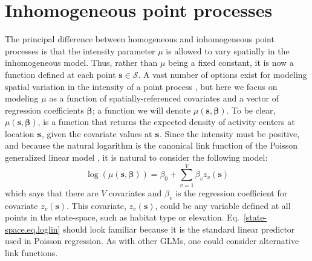 \section{Inhomogeneous point processes}

The principal difference between homogeneous and inhomogeneous point
processes is that the intensity parameter $\mu$ is allowed to vary spatially
in the inhomogeneous model. Thus, rather than $\mu$ being a fixed constant,
it is now a function defined at each point $\mathbf{s} \in
\mathcal{S}$. A vast number of options exist for modeling spatial
variation in the intensity of a point process
\citep{cox:1955,stoyan_penttinen:2000,illian_etal:2008}, but here we
focus on modeling $\mu$ as a function of
spatially-referenced covariates and a vector of regression
coefficients $\bm \beta$; a function we will denote $\mu(\mathbf{s},
\bm{\beta})$. To be clear, $\mu(\mathbf{s}, \bm{\beta})$, is a
function that returns the expected density of activity centers at
location $\bf s$, given the covariate values at $\bf s$.  Since the
intensity must be positive, and because the natural logarithm is the
canonical link function of the Poisson generalized linear model
\citep{mccullagh_nelder:1989}, it is natural to consider the following model:
\begin{equation}
  \log(\mu(\mathbf{s}, {\bm \beta})) = \beta_0 + \sum_{v=1}^V \beta_v z_v(\mathbf{s})%
  \label{state-space.eq.loglin}
\end{equation}
which says that there are $V$ covariates and $\beta_v$ is the
regression coefficient for covariate $z_v(\mathbf{s})$. This
covariate, $z_v(\mathbf{s})$, could be any variable defined at all points
in the state-space, such as habitat type or elevation.
Eq.~\ref{state-space.eq.loglin} should look familiar because it is the
standard linear predictor used in Poisson regression. As with other
GLMs, one could consider alternative link functions.

